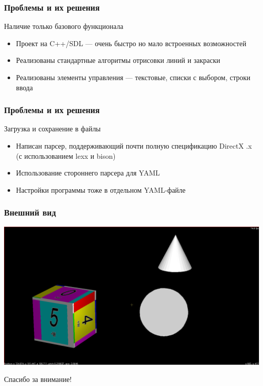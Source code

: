\documentclass{beamer}
\begin{document}

\begin{frame}
\frametitle{Проблемы и их решения}

Наличие только базового функционала
\begin{itemize}
\item Проект на C++/SDL — очень быстро но мало встроенных возможностей
\item Реализованы стандартные алгоритмы отрисовки линий и закраски
\item Реализованы элементы управления --- текстовые, списки с выбором, строки ввода
\end{itemize}
\end{frame}

\begin{frame}
\frametitle{Проблемы и их решения}

Загрузка и сохранение в файлы
\begin{itemize}
\item Написан парсер, поддерживающий почти полную спецификацию DirectX .x (с использованием lexx и bison)
\item Использование стороннего парсера для YAML
\item Настройки программы тоже в отдельном YAML-файле
\end{itemize}
\end{frame}

\begin{frame}
\frametitle{Внешний вид}

\centering
\includegraphics[width=\textwidth]{window}
\end{frame}

\begin{frame}
\centering
Спасибо за внимание!
\end{frame}
\end{document}
